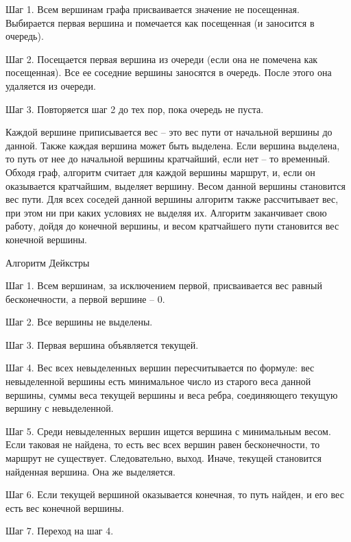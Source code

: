 Шаг 1. Всем вершинам графа присваивается значение не посещенная. Выбирается первая вершина и помечается как посещенная (и заносится в очередь).

Шаг 2. Посещается первая вершина из очереди (если она не помечена как посещенная). Все ее соседние вершины заносятся в очередь. После этого она удаляется из очереди.

Шаг 3. Повторяется шаг 2 до тех пор, пока очередь не пуста.


Каждой вершине приписывается вес – это вес пути от начальной вершины до данной. Также каждая вершина может быть выделена. Если вершина выделена, то путь от нее до начальной вершины кратчайший, если нет – то временный. Обходя граф, алгоритм считает для каждой вершины маршрут, и, если он оказывается кратчайшим, выделяет вершину. Весом данной вершины становится вес пути. Для всех соседей данной вершины алгоритм также рассчитывает вес, при этом ни при каких условиях не выделяя их. Алгоритм заканчивает свою работу, дойдя до конечной вершины, и весом кратчайшего пути становится вес конечной вершины.

Алгоритм Дейкстры

Шаг 1. Всем вершинам, за исключением первой, присваивается вес равный бесконечности, а первой вершине – 0.

Шаг 2. Все вершины не выделены.

Шаг 3. Первая вершина объявляется текущей.

Шаг 4. Вес всех невыделенных вершин пересчитывается по формуле: вес невыделенной вершины есть минимальное число из старого веса данной вершины, суммы веса текущей вершины и веса ребра, соединяющего текущую вершину с невыделенной.

Шаг 5. Среди невыделенных вершин ищется вершина с минимальным весом. Если таковая не найдена, то есть вес всех вершин равен бесконечности, то маршрут не существует. Следовательно, выход. Иначе, текущей становится найденная вершина. Она же выделяется.

Шаг 6. Если текущей вершиной оказывается конечная, то путь найден, и его вес есть вес конечной вершины.

Шаг 7. Переход на шаг 4.


\newpage
